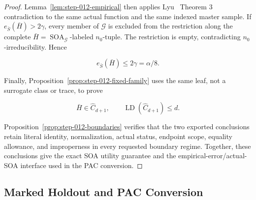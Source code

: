 \begin{proof}
Lemma~\ref{lem:step-012-empirical} then applies Lyu~\citep{lyu2025} Theorem 3
contradiction to the same actual function and the same indexed master
sample. If \(e_{\bar S}(\bar H)>2\gamma\), every member of
\(\mathcal G\) is excluded from the restriction along the complete
\(\bar H=\operatorname{SOA}_{\mathcal G}\)-labeled \(n_0\)-tuple. The
restriction is empty, contradicting \(n_0\)-irreducibility. Hence

\[
 e_{\bar S}(\bar H)\le2\gamma=\alpha/8.
\]

Finally, Proposition~\ref{prop:step-012-fixed-family} uses the same leaf,
not a surrogate class or trace, to prove

\[
 \bar H\in\widehat C_{d+1},
 \qquad
 \operatorname{LD}(\widehat C_{d+1})\le d.
\]

Proposition~\ref{prop:step-012-boundaries} verifies that the two exported
conclusions retain literal identity, normalization, actual status, endpoint
scope, equality allowance, and improperness in every requested boundary
regime. Together, these conclusions give the exact SOA utility guarantee
and the empirical-error/actual-SOA interface used in the PAC conversion.



\end{proof}

\subsection{Marked Holdout and PAC Conversion}\label{app:step_013}


